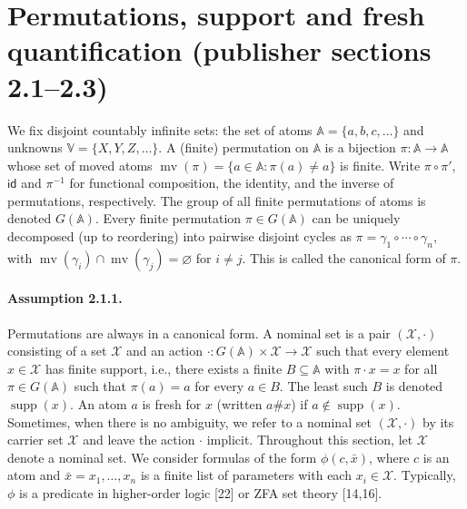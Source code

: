\section*{Permutations, support and fresh quantification (publisher sections 2.1--2.3)}
We fix disjoint countably infinite sets: the set of atoms $\mathbb A=\{a,b,c,\ldots\}$ and unknowns $\mathbb V=\{X,Y,Z,\ldots\}$.
A (finite) permutation on $\mathbb A$ is a bijection $\pi:\mathbb A\to\mathbb A$ whose set of moved atoms $\operatorname{mv}(\pi)=\{a\in\mathbb A:\pi(a)\ne a\}$ is finite. Write $\pi\circ\pi'$, $\mathsf{id}$ and $\pi^{-1}$ for functional composition, the identity, and the inverse of permutations, respectively.
The group of all finite permutations of atoms is denoted $G(\mathbb A)$.
Every finite permutation $\pi\in G(\mathbb A)$ can be uniquely decomposed (up to reordering) into pairwise disjoint cycles as $\pi=\gamma_1\circ\cdots\circ\gamma_n$, with $\operatorname{mv}(\gamma_i)\cap\operatorname{mv}(\gamma_j)=\varnothing$ for $i\ne j$.
This is called the canonical form of $\pi$.
\paragraph{Assumption 2.1.1.} Permutations are always in a canonical form.
A nominal set is a pair $(\mathcal X,\cdot)$ consisting of a set $\mathcal X$ and an action $\cdot:G(\mathbb A)\times\mathcal X\to\mathcal X$ such that every element $x\in\mathcal X$ has finite support, i.e., there exists a finite $B\subseteq\mathbb A$ with $\pi\cdot x=x$ for all $\pi\in G(\mathbb A)$ such that $\pi(a)=a$ for every $a\in B$.
The least such $B$ is denoted $\operatorname{supp}(x)$. An atom $a$ is fresh for $x$ (written $a\#x$) if $a\notin\operatorname{supp}(x)$.
Sometimes, when there is no ambiguity, we refer to a nominal set $(\mathcal X,\cdot)$ by its carrier set $\mathcal X$ and leave the action $\cdot$ implicit.
Throughout this section, let $\mathcal X$ denote a nominal set. We consider formulas of the form $\phi(c,\bar x)$, where $c$ is an atom and $\bar x=x_1,\ldots,x_n$ is a finite list of parameters with each $x_i\in\mathcal X$.
Typically, $\phi$ is a predicate in higher-order logic [22] or ZFA set theory [14,16].

